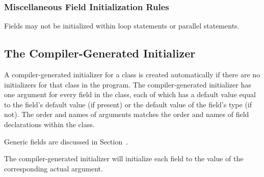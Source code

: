 \subsubsection{Miscellaneous Field Initialization Rules}

Fields may not be initialized within loop statements or parallel statements.

\subsection{The Compiler-Generated Initializer}
\label{The_Compiler_Generated_Initializer}

A compiler-generated initializer for a class is created automatically if there
are no initializers for that class in the program. The compiler-generated
initializer has one argument for every field in the class, each of which has a
default value equal to the field's default value (if present) or the default
value of the field's type (if not). The order and names of arguments matches
the order and names of field declarations within the class.

Generic fields are discussed in Section~.

The compiler-generated initializer will initialize each field to the value of
the corresponding actual argument.

